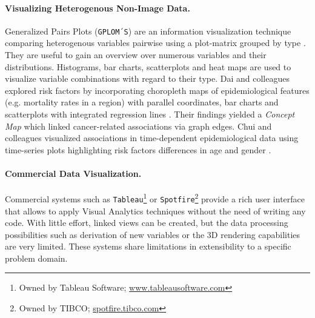 \documentclass[journal]{style/vgtc} 			          %
\begin{document}
\paragraph{Visualizing Heterogenous Non-Image Data.}
Generalized Pairs Plots (\texttt{GPLOM´S}) are an information visualization technique comparing heterogenous variables pairwise using a plot-matrix grouped by type \cite{Francois2013}.
%
They are useful to gain an overview over numerous variables and their distributions.
%
Histograms, bar charts, scatterplots and heat maps are used to visualize variable combinations with regard to their type.
%
%
%
%
Dai and colleagues explored risk factors by incorporating choropleth maps of epidemiological features (e.g. mortality rates in a region) with parallel coordinates, bar charts and scatterplots with integrated regression lines \cite{Dai2005}.
%
Their findings yielded a \emph{Concept Map} which linked cancer-related associations via graph edges.
Chui and colleagues visualized associations in time-dependent epidemiological data using time-series plots highlighting risk factors differences in age and gender \cite{Chui2011}.

\paragraph{Commercial Data Visualization.}
Commercial systems such as \texttt{Tableau}\footnote{Owned by Tableau Software; \url{www.tableausoftware.com}} or \texttt{Spotfire}\footnote{Owned by TIBCO; \url{spotfire.tibco.com}} provide a rich user interface that allows to apply Visual Analytics techniques without the need of writing any code.
%
With little effort, linked views can be created, but the data processing possibilities such as derivation of new variables or the 3D rendering capabilities are very limited.
%
These systems share limitations in extensibility to a specific problem domain.
\end{document}
